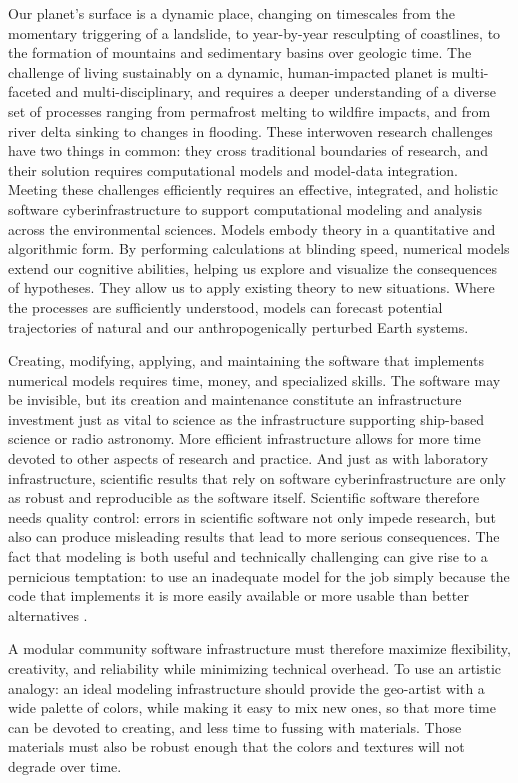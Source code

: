 \documentclass[journal abbreviation, manuscript]{copernicus}
\begin{document}
\introduction

Our planet's surface is a dynamic place, changing on timescales from the momentary triggering of a landslide, to year-by-year resculpting of coastlines, to the formation of mountains and sedimentary basins over geologic time. The challenge of living sustainably on a dynamic, human-impacted planet is multi-faceted and multi-disciplinary, and requires a deeper understanding of a diverse set of processes ranging from permafrost melting to wildfire impacts, and from river delta sinking to changes in flooding. These interwoven research challenges have two things in common: they cross traditional boundaries of research, and their solution requires computational models and model-data integration. Meeting these challenges efficiently requires an effective, integrated, and holistic software cyberinfrastructure to support computational modeling and analysis across the environmental sciences. Models embody theory in a quantitative and algorithmic form. By performing calculations at blinding speed, numerical models extend our cognitive abilities, helping us explore and visualize the consequences of hypotheses. They allow us to apply existing theory to new situations. Where the processes are sufficiently understood, models can forecast potential trajectories of natural and our anthropogenically perturbed Earth systems.

Creating, modifying, applying, and maintaining the software that implements numerical models requires time, money, and specialized skills. The software may be invisible, but its creation and maintenance constitute an infrastructure investment just as vital to science as the infrastructure supporting ship-based science or radio astronomy. More efficient infrastructure allows for more time devoted to other aspects of research and practice. And just as with laboratory infrastructure, scientific results that rely on software cyberinfrastructure are only as robust and reproducible as the software itself. Scientific software therefore needs quality control: errors in scientific software not only impede research, but also can produce misleading results that lead to more serious consequences. The fact that modeling is both useful and technically challenging can give rise to a pernicious temptation: to use an inadequate model for the job simply because the code that implements it is more easily available or more usable than better alternatives \citep{addor2019legacy}. 

A modular community software infrastructure must therefore maximize flexibility, creativity, and reliability while minimizing technical overhead. To use an artistic analogy: an ideal modeling infrastructure should provide the geo-artist with a wide palette of colors, while making it easy to mix new ones, so that more time can be devoted to creating, and less time to fussing with materials. Those materials must also be robust enough that the colors and textures will not degrade over time.
\end{document}
